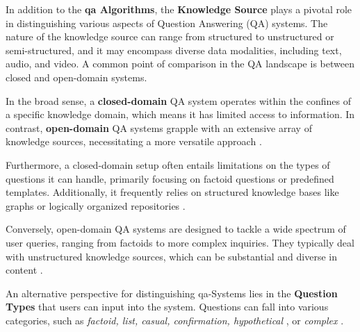 In addition to the \textbf{\gls{qa} Algorithms}, the \textbf{Knowledge Source} plays a pivotal role in distinguishing various aspects of Question Answering (QA) systems. The nature of the knowledge source can range from structured to unstructured or semi-structured, and it may encompass diverse data modalities, including text, audio, and video. A common point of comparison in the QA landscape is between closed and open-domain systems.

In the broad sense, a \textbf{closed-domain} QA system operates within the confines of a specific knowledge domain, which means it has limited access to information. In contrast, \textbf{open-domain} QA systems grapple with an extensive array of knowledge sources, necessitating a more versatile approach \cite{farea_evaluation_2022}.

Furthermore, a closed-domain setup often entails limitations on the types of questions it can handle, primarily focusing on factoid questions or predefined templates. Additionally, it frequently relies on structured knowledge bases like graphs or logically organized repositories \cite{hao_recent_2022}.

Conversely, open-domain QA systems are designed to tackle a wide spectrum of user queries, ranging from factoids to more complex inquiries. They typically deal with unstructured knowledge sources, which can be substantial and diverse in content \cite{zhu_retrieving_2021, farea_evaluation_2022, jurafsky_speech_2023}.

An alternative perspective for distinguishing \gls{qa}-Systems lies in the \textbf{Question Types} that users can input into the system. Questions can fall into various categories, such as \textit{factoid, list, casual, confirmation, hypothetical} \cite{mishra_survey_2016}, or \textit{complex} \cite{etezadi_state_2023}.

